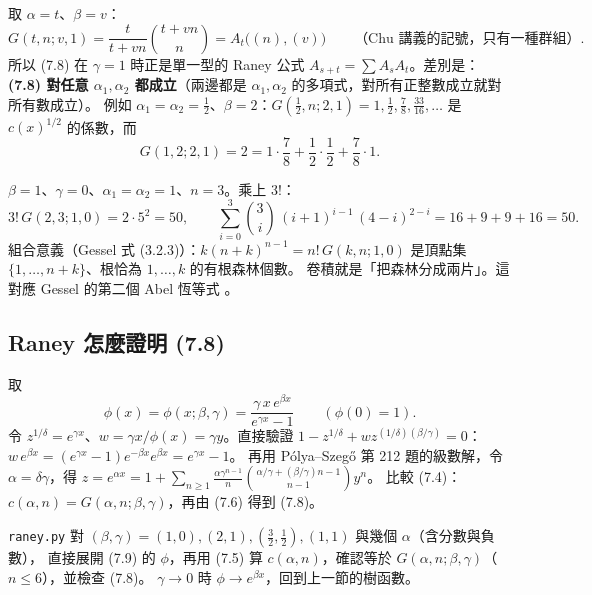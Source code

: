 \begin{keybox}[$\gamma=1$ 就是 Chu 的 Raney 公式 \extra]
取 $\alpha=t$、$\beta=v$：
\[
G(t,n;v,1)=\frac{t}{t+vn}\binom{t+vn}{n}=A_t\big((n),(v)\big)\qquad\text{（Chu 講義的記號，只有一種群組）}.
\]
所以 (7.8) 在 $\gamma=1$ 時正是單一型的 Raney 公式 $A_{s+t}=\sum A_sA_t$。差別是：
\textbf{(7.8) 對任意 $\alpha_1,\alpha_2$ 都成立}（兩邊都是 $\alpha_1,\alpha_2$ 的多項式，對所有正整數成立就對所有數成立）。
例如 $\alpha_1=\alpha_2=\frac12$、$\beta=2$：$G(\frac12,n;2,1)=1,\frac12,\frac78,\frac{33}{16},\ldots$ 是 $c(x)^{1/2}$ 的係數，而
\[
\textstyle G(1,2;2,1)=2=1\cdot\frac78+\frac12\cdot\frac12+\frac78\cdot1 .
\]
\end{keybox}

\begin{exbox}
$\beta=1$、$\gamma=0$、$\alpha_1=\alpha_2=1$、$n=3$。乘上 $3!$：
\[
3!\,G(2,3;1,0)=2\cdot5^2=50,\qquad
\sum_{i=0}^{3}\binom3i\,(i+1)^{i-1}\,(4-i)^{2-i}=16+9+9+16=50 .
\]
組合意義（Gessel 式 (3.2.3)）：$k(n+k)^{n-1}=n!\,G(k,n;1,0)$ 是頂點集 $\{1,\ldots,n+k\}$、根恰為 $1,\ldots,k$ 的有根森林個數。
卷積就是「把森林分成兩片」。這對應 Gessel 的第二個 Abel 恆等式 。
\end{exbox}

\subsection{Raney 怎麼證明 (7.8)}

取 
\begin{equation}\tag{7.9}
\phi(x)=\phi(x;\beta,\gamma)=\frac{\gamma\,x\,e^{\beta x}}{e^{\gamma x}-1}\qquad(\phi(0)=1).
\end{equation}
令 $z^{1/\delta}=e^{\gamma x}$、$w=\gamma x/\phi(x)=\gamma y$。直接驗證 $1-z^{1/\delta}+wz^{(1/\delta)(\beta/\gamma)}=0$：
$w\,e^{\beta x}=(e^{\gamma x}-1)e^{-\beta x}e^{\beta x}=e^{\gamma x}-1$。
再用 Pólya--Szegő 第 212 題的級數解，令 $\alpha=\delta\gamma$，得 $z=e^{\alpha x}=1+\sum_{n\ge1}\frac{\alpha\gamma^{n-1}}{n}\binom{\alpha/\gamma+(\beta/\gamma)n-1}{n-1}y^n$。
比較 (7.4)：$c(\alpha,n)=G(\alpha,n;\beta,\gamma)$，再由 (7.6) 得到 (7.8)。

\begin{notebox}[程式驗證]
\texttt{raney.py} 對 $(\beta,\gamma)=(1,0),(2,1),(\frac32,\frac12),(1,1)$ 與幾個 $\alpha$（含分數與負數），
直接展開 (7.9) 的 $\phi$，再用 (7.5) 算 $c(\alpha,n)$，確認等於 $G(\alpha,n;\beta,\gamma)$（$n\le6$），並檢查 (7.8)。
$\gamma\to0$ 時 $\phi\to e^{\beta x}$，回到上一節的樹函數。
\end{notebox}
